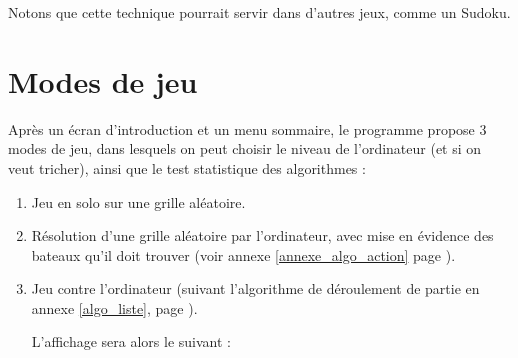 Notons que cette technique pourrait servir dans d'autres jeux, comme un Sudoku.


\newpage
\section{Modes de jeu}
Après un écran d'introduction et un menu sommaire, le programme propose 3 modes de jeu, dans lesquels on peut choisir le niveau de l'ordinateur (et si on veut tricher), ainsi que le test statistique des algorithmes :
\begin{enumerate}
\item Jeu en solo sur une grille aléatoire.
\item Résolution d'une grille aléatoire par l'ordinateur, avec mise en évidence des bateaux qu'il doit trouver (voir annexe \ref{annexe_algo_action} page \pageref{annexe_algo_action}).
\item Jeu contre l'ordinateur (suivant l'algorithme de déroulement de partie en annexe \ref{algo_liste}, page \pageref{algo_partie}).

L'affichage sera alors le suivant :


\end{enumerate}
